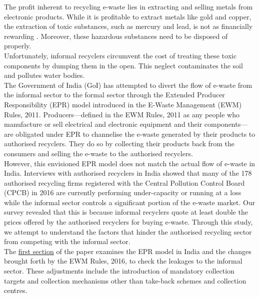 \documentclass[a4paper, 12pt]{article}
\begin{document}
                    The profit inherent to recycling e-waste lies in extracting and selling metals from electronic products. While it is profitable to extract metals like gold and copper, the extraction of toxic substances, such as mercury and lead, is not as financially rewarding \parencite{worstallnews}. Moreover, these hazardous substances need to be disposed of properly. \\
                    
                    Unfortunately, informal recyclers circumvent the cost of treating these toxic components by dumping them in the open. This neglect contaminates the soil and pollutes water bodies. \\
                    
                    The Government of India (GoI) has attempted to divert the flow of e-waste from the informal sector to the formal sector through the Extended Producer Responsibility (EPR) model introduced in the E-Waste Management (EWM) Rules, 2011. Producers—defined in the EWM Rules, 2011 as any people who manufacture or sell electrical and electronic equipment and their components—are obligated under EPR to channelise the e-waste generated by their products to authorised recyclers. They do so by collecting their products back from the consumers and selling the e-waste to the authorised recyclers. \\
                    
                    However, this envisioned EPR model does not match the actual flow of e-waste in India. Interviews with authorised recyclers in India showed that many of the 178 authorised recycling firms registered with the Central Pollution Control Board (CPCB) in 2016 are currently performing under-capacity or running at a loss while the informal sector controls a significant portion of the e-waste market. Our survey revealed that this is because informal recyclers quote at least double the prices offered by the authorised recyclers for buying e-waste. Through this study, we attempt to understand the factors that hinder the authorised recycling sector from competing with the informal sector. \\

                    The \hyperref[sec:1]{first section} of the paper examines the EPR model in India and the changes brought forth by the EWM Rules, 2016, to check the leakages to the informal sector. These adjustments include the introduction of mandatory collection targets and collection mechanisms other than take-back schemes and collection centres. \\
                    
\end{document}
